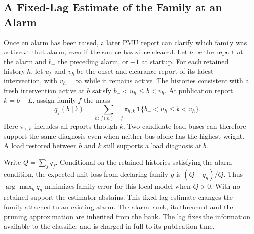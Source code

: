 \subsection{A Fixed-Lag Estimate of the Family at an Alarm}
\label{sec:alarm-family}

Once an alarm has been raised, a later PMU report can clarify which
family was active at that alarm, even if the source has since cleared.
Let $b$ be the report at the alarm and $b_-$ the preceding alarm, or
$-1$ at startup. For each retained history $h$, let $u_h$ and $v_h$
be the onset and clearance report of its latest intervention, with
$v_h=\infty$ while it remains active. The histories consistent with a
fresh intervention active at $b$ satisfy $b_-<u_h\le b<v_h$.
At publication report $k=b+L$, assign family $f$ the mass
\begin{equation}
 q_f(b\mid k)=\sum_{h:\, f(h)=f}\pi_{h,k}\,
        \mathbf{1}\{b_-<u_h\le b<v_h\}.
 \label{eq:alarm-family-mass}
\end{equation}
Here $\pi_{h,k}$ includes all reports through $k$. Two candidate load
buses can therefore support the same diagnosis even when neither bus
alone has the highest weight. A load restored between $b$ and $k$ still
supports a load diagnosis at $b$.

Write $Q=\sum_f q_f$. Conditional on the retained histories satisfying
the alarm condition, the expected unit loss from declaring family $g$
is $(Q-q_g)/Q$. Thus $\arg\max_g q_g$ minimizes family error for this
local model when $Q>0$. With no retained support the estimator abstains.
This fixed-lag estimate changes the family attached to an existing alarm.
The alarm clock, its threshold and the pruning approximation are inherited
from the bank. The lag fixes the information available to the classifier
and is charged in full to its publication time.
